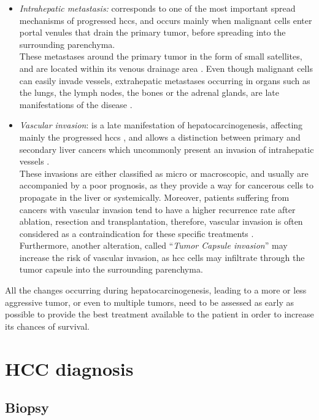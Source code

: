 \begin{itemize}
\item \emph{Intrahepatic metastasis:} corresponds to one of the most
  important spread mechanisms of progressed \ac{hcc}s, and occurs
  mainly when malignant cells enter portal venules that drain the
  primary tumor, before spreading into the surrounding parenchyma.\\
  These metastases around the primary tumor in the form of small
  satellites, and are located within its venous drainage area \cite{Nakashima2003}. Even though malignant cells can
  easily invade vessels, extrahepatic metastases occurring in organs
  such as the lungs, the lymph nodes, the bones or the adrenal glands,
  are late manifestations of the disease \cite{Theise2006, Trevisani2008a}.
\item \emph{Vascular invasion}: is a late manifestation of
  hepatocarcinogenesis, affecting mainly the progressed \ac{hcc}s
  \cite{EdmondsonHA1954}, and allows a distinction between
  primary and secondary liver cancers which uncommonly present an
  invasion of intrahepatic vessels \cite{Okuda1997}.\\
  These invasions are either classified as micro or macroscopic, and
  usually are accompanied by a poor prognosis, as they provide a way for
  cancerous cells to propagate in the liver or systemically. Moreover,
  patients suffering from cancers with vascular invasion tend to have a
  higher recurrence rate after ablation, resection and transplantation,
  therefore, vascular invasion is often considered as a contraindication
  for these specific treatments \cite{Llovet2004}.\\
  Furthermore, another alteration, called ``\emph{Tumor Capsule
  invasion}'' may increase the risk of vascular invasion, as \ac{hcc}
  cells may infiltrate through the tumor capsule into the surrounding
  parenchyma.
\end{itemize}

All the changes occurring during hepatocarcinogenesis, leading to a more
or less aggressive tumor, or even to multiple tumors, need to be
assessed as early as possible to provide the best treatment available to
the patient in order to increase its chances of survival.

\section{HCC diagnosis}\label{diagnosis}

\subsection{Biopsy}\label{biopsy}

